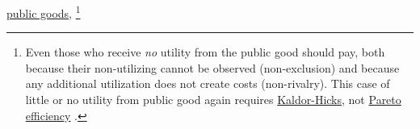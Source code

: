 \begin{description}


	\hyperref[sec:public-good]{public goods},
	\footnote{
		Even those who receive \emph{no} utility from the public good should pay, both because their non-utilizing cannot be observed (non-exclusion) and because any additional utilization does not create costs (non-rivalry).
		This case of little or no utility from public good again requires \hyperref[sec:KaldorHicks]{Kaldor-Hicks}, not \hyperref[sec:Pareto]{Pareto efficiency} \citep{Kaldor1939,Hicks1939}.
	}





\end{description}
